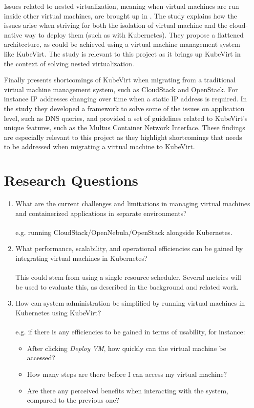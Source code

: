 \documentclass{article}
\begin{document}
Issues related to nested virtualization, meaning when virtual machines are run inside other virtual machines, are brought up in \cite{free-turtles}. The study explains how the issues arise when striving for both the isolation of virtual machine and the cloud-native way to deploy them (such as with Kubernetes). They propose a flattened architecture, as could be achieved using a virtual machine management system like KubeVirt. The study is relevant to this project as it brings up KubeVirt in the context of solving nested virtualization.  
 
Finally \cite{kubevirt-migrate-issues} presents shortcomings of KubeVirt when migrating from a traditional virtual machine management system, such as CloudStack and OpenStack. For instance IP addresses changing over time when a static IP address is required. In the study they developed a framework to solve some of the issues on application level, such as DNS queries, and provided a set of guidelines related to KubeVirt's  unique features, such as the Multus Container Network Interface. These findings are especially relevant to this project as they highlight shortcomings that needs to be addressed when migrating a virtual machine to KubeVirt. 


\section{Research Questions}

\begin{enumerate}
    \item What are the current challenges and limitations in managing virtual machines and containerized applications in separate environments?\\
    \\
     e.g. running CloudStack/OpenNebula/OpenStack alongside Kubernetes.

    \item What performance, scalability, and operational efficiencies can be gained by integrating virtual machines in Kubernetes?\\
    \\
    This could stem from using a single resource scheduler. Several metrics will be used to evaluate this, as described in the background and related work.

    \item How can system administration be simplified by running virtual machines in Kubernetes using KubeVirt?\\
    \\
    e.g. if there is any efficiencies to be gained in terms of usability, for instance:
    \begin{itemize}
        \item After clicking \textit{Deploy VM}, how quickly can the virtual machine be accessed?
        \item How many steps are there before I can access my virtual machine?
        \item Are there any perceived benefits when interacting with the system, compared to the previous one?
    \end{itemize}
\end{enumerate}
\end{document}
